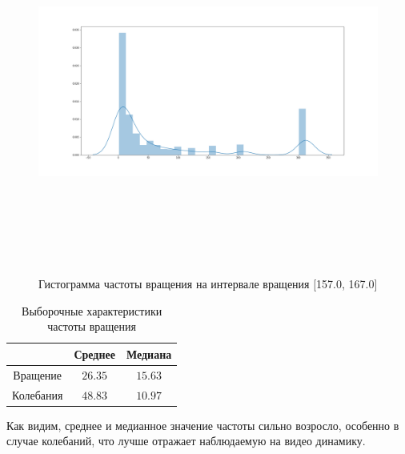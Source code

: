 \documentclass[a4paper,12pt]{article} %
\begin{document}
	\begin{figure}[H]		
		\includegraphics[width = 18cm, height = 12cm]{fluct_droped_hist.png}
		\caption{Гистограмма частоты вращения на интервале вращения [157.0, 167.0]}
		\label{fig:fluct_droped_hist}
	\end{figure}

	\begin{table}[H]
		\caption{Выборочные характеристики частоты вращения}
		\label{tab:my_label3}
		\begin{center}
			\vspace{5mm}
			\begin{tabular}{|c|c|c|}
				\hline
				& Среднее & Медиана\\
				\hline
				Вращение & $ 26.35 $ & $ 15.63 $\\
				\hline
				Колебания & $ 48.83 $ & $ 10.97 $\\
				\hline
			\end{tabular}
		\end{center}
	\end{table}

	Как видим, среднее и медианное значение частоты сильно возросло, особенно в случае колебаний, что лучше отражает наблюдаемую на видео динамику.
	
\end{document}
